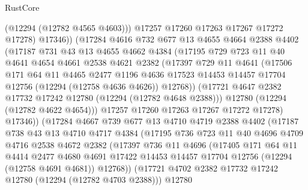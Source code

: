 \begin{lexlean}{RustCore}
\begin{coremodule}
                  (@12294 (@12782 @4565 @4603)))
                @17257
                @17260
                @17263
                @17267
                @17272
                @17278)
              @17346))
          (@17284
            @4616
            @732
            @677
            @13
            @4655
            @4664
            @2388
            @4402
            (@17187
              @731
              @43
              @13
              @4655
              @4662
              @4384
              (@17195
                @729
                @723
                @11
                @40
                @4641
                @4654
                @4661
                @2538
                @4621
                @2382
                (@17397
                  @729
                  @11
                  @4641
                  (@17506
                    @171
                    @64
                    @11
                    @4465
                    @2477
                    @1196
                    @4636
                    @17523
                    @14453
                    @14457
                    @17704
                    @12756
                    (@12294 (@12758 @4636 @4626))
                    @12768))
                (@17721 @4647 @2382 @17732 @17242 @12780 (@12294 (@12782 @4648 @2388)))
                @12780
                (@12294 (@12782 @4622 @4654)))
              @17257
              @17260
              @17263
              @17267
              @17272
              @17278)
            @17346))
        (@17284
          @4667
          @739
          @677
          @13
          @4710
          @4719
          @2388
          @4402
          (@17187
            @738
            @43
            @13
            @4710
            @4717
            @4384
            (@17195
              @736
              @723
              @11
              @40
              @4696
              @4709
              @4716
              @2538
              @4672
              @2382
              (@17397
                @736
                @11
                @4696
                (@17405
                  @171
                  @64
                  @11
                  @4414
                  @2477
                  @4680
                  @4691
                  @17422
                  @14453
                  @14457
                  @17704
                  @12756
                  (@12294 (@12758 @4691 @4681))
                  @12768))
              (@17721 @4702 @2382 @17732 @17242 @12780 (@12294 (@12782 @4703 @2388)))
              @12780

\end{coremodule}
\end{lexlean}
